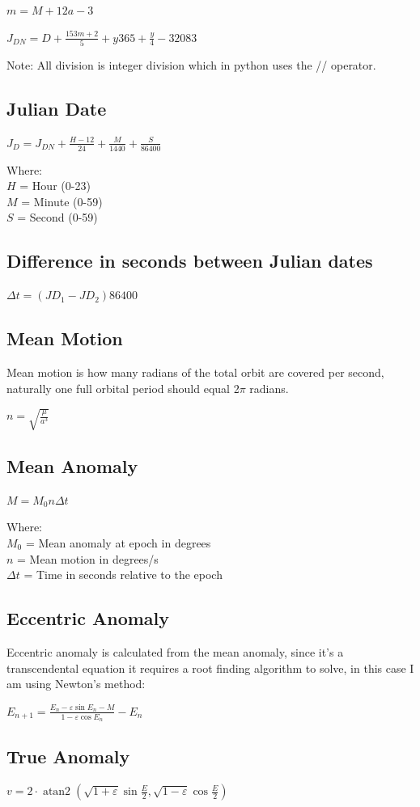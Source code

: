 \documentclass{article}
\DeclareMathOperator{\atantwo}{atan2}
\begin{document}
$ m = M + 12 a - 3 $

$J_{DN} = D + \frac{153m+2}{5} + y365 + \frac{y}{4} - 32083$

Note: All division is integer division which in python uses the // operator.

\subsection{Julian Date}

$ J_{D} = J_{DN} + \frac{H-12}{24} + \frac{M}{1440} + \frac{S}{86400} $

Where:\\
$H$ = Hour (0-23)\\
$M$ = Minute (0-59)\\
$S$ = Second (0-59)

\subsection{Difference in seconds between Julian dates}

$ \Delta t =  (JD_1 - JD_2) 86400 $

\subsection{Mean Motion}

Mean motion is how many radians of the total orbit are covered per second, naturally one full orbital period should equal 2$\pi$ radians.

$ n = \sqrt{\frac{\mu}{a^3}} $

\subsection{Mean Anomaly}

$ M = M_0 n \Delta t $

Where:\\
$M_0$ = Mean anomaly at epoch in degrees\\
$n$ = Mean motion in degrees/s\\
$\Delta t$ = Time in seconds relative to the epoch

\subsection{Eccentric Anomaly}

Eccentric anomaly is calculated from the mean anomaly, since it's a transcendental equation it requires a root finding algorithm to solve, in this case I am using Newton's method:

$ E_{n+1} = \frac{E_n - \varepsilon \sin{E_n} - M }{1 - \varepsilon \cos{E_n}}-E_n $

\subsection{True Anomaly}

$ v = 2 \cdot \atantwo(\sqrt{1+\varepsilon} \sin{\frac{E}{2}}, \sqrt{1-\varepsilon} \cos{\frac{E}{2}}) $
\end{document}
